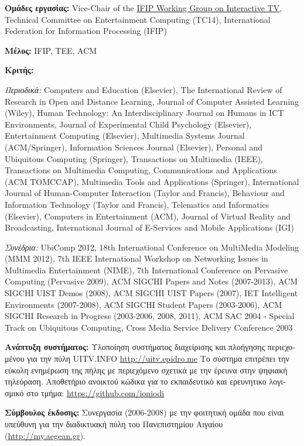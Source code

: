\documentclass[11pt, a4paper]{article}
\begin{document}
\begin{greek}
\textbf{Ομάδες εργασίας:} Vice-Chair of the
\href{http://www.ifip.org/bulletin/bulltcs/memtc14.htm\#WG146}{IFIP
Working Group on Interactive TV}, Technical Committee on Entertainment
Computing (TC14), International Federation for Information Processing
(IFIP)

\textbf{Μέλος:} IFIP, TEE, ACM

\textbf{Κριτής:}

\emph{Περιοδικά:} Computers and Education (Elsevier), The International
Review of Research in Open and Distance Learning, Journal of Computer
Assisted Learning (Wiley), Human Technology: An Interdisciplinary
Journal on Humans in ICT Environments, Journal of Experimental Child
Psychology (Elsevier), Entertainment Computing (Elsevier), Multimedia
Systems Journal (ACM/Springer), Information Sciences Journal (Elsevier),
Personal and Ubiquitous Computing (Springer), Transactions on Multimedia
(IEEE), Transactions on Multimedia Computing, Communications and
Applications (ACM TOMCCAP), Multimedia Tools and Applications
(Springer), International Journal of Human-Computer Interaction (Taylor
and Francis), Behaviour and Information Technology (Taylor and Francis),
Telematics and Informatics (Elsevier), Computers in Entertainment (ACM),
Journal of Virtual Reality and Broadcasting, International Journal of
E-Services and Mobile Applications (IGI)

\emph{Συνέδρια:} UbiComp 2012, 18th International Conference on
MultiMedia Modeling (MMM 2012), 7th IEEE International Workshop on
Networking Issues in Multimedia Entertainment (NIME),
7th International Conference on Pervasive Computing (Pervasive 2009),
ACM SIGCHI Papers and Notes (2007-2013), ACM SIGCHI UIST Demos (2008),
ACM SIGCHI UIST Papers (2007), IEΤ Intelligent Environments (2007-2008),
ACM SIGCHI Student Papers (2003-2006), ACM SIGCHI Research in Progress
(2003-2006, 2008, 2011), ACM SAC 2004 - Special Track on Ubiquitous
Computing, Cross Media Service Delivery Conference 2003

\textbf{Ανάπτυξη συστήματος:} Υλοποίηση συστήματος διαχείρισης και
πλοήγησης περιεχομένου για την πύλη UITV.INFO
\href{http://uitv.epidro.me}{\uline{http://uitv.epidro.me}} Το σύστημα
επιτρέπει την εύκολη ενημέρωση της πήλης με περιεχόμενο σχετικά με την
έρευνα στην ψηφιακή τηλεόραση. Αποθετήριο ανοικτού κώδικα για το
εκπαιδευτικό και ερευνητικο λογισμικό στο τμήμα:
\href{https://github.com/ioniodi}{\uline{https://github.com/ioniodi}}

\textbf{Σύμβουλος έκδοσης:} Συνεργασία (2006-2008) με την φοιτητική
ομάδα που είναι υπεύθυνη για την διαδικτυακή πύλη του Πανεπιστημίου
Αιγαίου (\href{http://my.aegean.gr/}{\uline{http://my.aegean.gr}}).


\end{greek}
\end{document}
